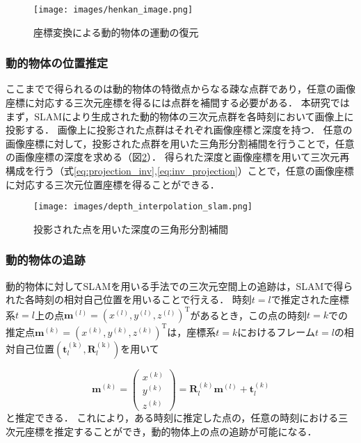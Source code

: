 \begin{figure}[h]
	\centering
	\texttt{[image: images/henkan\_image.png]}
	\caption{座標変換による動的物体の運動の復元}
	\label{fig:henkan}
\end{figure}

\subsubsection{動的物体の位置推定}\label{subsubsec:3Dposition_inference}
ここまでで得られるのは動的物体の特徴点からなる疎な点群であり，任意の画像座標に対応する三次元座標を得るには点群を補間する必要がある．
本研究ではまず，SLAMにより生成された動的物体の三次元点群を各時刻において画像上に投影する．
画像上に投影された点群はそれぞれ画像座標と深度を持つ．
任意の画像座標に対して，投影された点群を用いた三角形分割補間を行うことで，任意の画像座標の深度を求める（図\ref{fig:depth_interpolation_slam}）．
得られた深度と画像座標を用いて三次元再構成を行う（式\ref{eq:projection_inv},\ref{eq:inv_projection}）ことで，任意の画像座標に対応する三次元位置座標を得ることができる．

\begin{figure}[ht]
	\centering
	\texttt{[image: images/depth\_interpolation\_slam.png]}
	\caption{投影された点を用いた深度の三角形分割補間}
	\label{fig:depth_interpolation_slam}
\end{figure}

\subsubsection{動的物体の追跡}\label{subsubsec:displacement_inference}

動的物体に対してSLAMを用いる手法での三次元空間上の追跡は，SLAMで得られた各時刻の相対自己位置を用いることで行える．
時刻$t=l$で推定された座標系$t=l$上の点$\mathbf{m}^{(l)}={(x^{(l)} , y^{(l)}, z^{(l)})}^\mathrm{T}$があるとき，この点の時刻$t=k$での推定点$\mathbf{m}^{(k)}={(x^{(k)} , y^{(k)}, z^{(k)})}^\mathrm{T}$は，座標系$t=k$におけるフレーム$t=l$の相対自己位置$(\mathbf{t}^{(\text{k})}_l,\mathbf{R}^{(\text{k})}_l)$を用いて

\begin{equation}\label{eq:trans3}
	\mathbf{m}^{(k)}
	=
	\left(\begin{array}{c}
		x^{(k)} \\ y^{(k)} \\ z^{(k)}
	\end{array}
	\right)
	=
	\mathbf{R}^{(k)}_{l}\mathbf{m}^{(l)}
	+\mathbf{t}^{(k)}_{l} 
\end{equation}
と推定できる．
これにより，ある時刻に推定した点の，任意の時刻における三次元座標を推定することができ，動的物体上の点の追跡が可能になる．